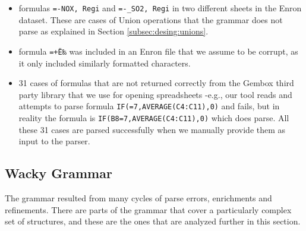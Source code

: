 \documentclass[conference]{IEEEtran}
\begin{document}
\begin{itemize}
	\item formulas \texttt{=-NOX, Regi} and \texttt{=-_SO2, Regi} in two different sheets in the Enron dataset. These are cases of Union operations that the grammar does not parse as explained in Section \ref{subsec:desing:unions}.
	\item formula \texttt{=+Ë‰} was included in an Enron file that we assume to be corrupt, as it only included similarly formatted characters.
	\item 31 cases of formulas that are not returned correctly from the Gembox third party library that we use for opening spreadsheets -e.g., our tool reads and attempts to parse formula \texttt{IF(=7,AVERAGE(C4:C11),0)} and fails, but in reality the formula is \texttt{IF(B8=7,AVERAGE(C4:C11),0)} which does parse. All these 31 cases are parsed successfully when we manually provide them as input to the parser.
\end{itemize}

\subsection{Wacky Grammar}
The grammar resulted from many cycles of parse errors, enrichments and refinements. There are parts of the grammar that cover a particularly complex set of structures, and these are the ones that are analyzed further in this section.
\end{document}
